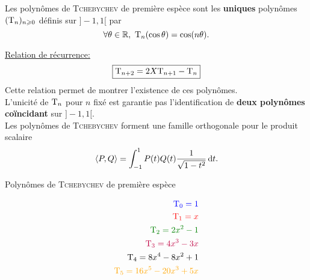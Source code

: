 \begin{defi}
    Les polynômes de \textsc{Tchebychev} de première espèce sont les \textbf{uniques} polynômes $(\mathrm{T}_n)_{n \geqslant 0}$ définis sur $]-1, 1[$ par
    $$\forall \theta \in \mathbb{R},\ \mathrm{T}_n (\cos \theta) = \cos(n \theta).$$
\end{defi}

\underline{Relation de récurrence:}
$$\boxed{\mathrm{T}_{n+2} = 2X \mathrm{T}_{n+1} - \mathrm{T}_n}$$
Cette relation permet de montrer l'existence de ces polynômes. \\
L'unicité de $\mathrm{T}_n$ pour $n$ fixé est garantie pas l'identification de \textbf{deux polynômes coïncidant} sur $]-1, 1[$. \\
Les polynômes de \textsc{Tchebychev} forment une famille orthogonale pour le produit scalaire
$$\langle P, Q \rangle = \int_{-1}^{1} P(t) Q(t) \frac{1}{\sqrt{1-t^2}} \, \mathrm{d} t.$$

\begin{marginfigure}[-8.5cm]
    \centering
	
	\caption*{\centering Polynômes de \textsc{Tchebychev} de première espèce}
	\begin{align*}
	   	\color{blue} \Tcheby_0 = 1 \\
    	\color{red} \Tcheby_1 = x \\
    	\color{green} \Tcheby_2 = 2x^2-1 \\
    	\color{purple} \Tcheby_3 = 4x^3-3x \\
    	\color{black} \Tcheby_4 = 8x^4-8x^2+1 \\
    	\color{orange} \Tcheby_5 = 16x^5-20x^3+5x
	\end{align*}
\end{marginfigure}
